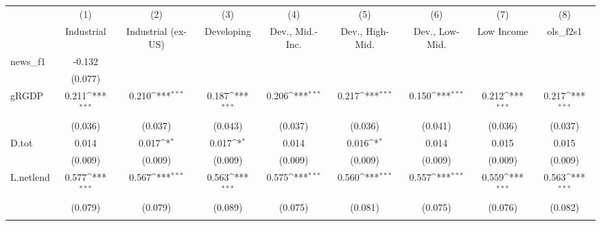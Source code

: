 {
\def\sym#1{\ifmmode^{#1}\else\(^{#1}\)\fi}
\begin{tabular}{l*{8}{c}}
\toprule
            &\multicolumn{1}{c}{(1)}&\multicolumn{1}{c}{(2)}&\multicolumn{1}{c}{(3)}&\multicolumn{1}{c}{(4)}&\multicolumn{1}{c}{(5)}&\multicolumn{1}{c}{(6)}&\multicolumn{1}{c}{(7)}&\multicolumn{1}{c}{(8)}\\
            &\multicolumn{1}{c}{Industrial}&\multicolumn{1}{c}{Industrial (ex-US)}&\multicolumn{1}{c}{Developing}&\multicolumn{1}{c}{Dev., Mid.-Inc.}&\multicolumn{1}{c}{Dev., High-Mid.}&\multicolumn{1}{c}{Dev., Low-Mid.}&\multicolumn{1}{c}{Low Income}&\multicolumn{1}{c}{ols\_f2s1}\\
\midrule
news\_f1     &      -0.132         &                     &                     &                     &                     &                     &                     &                     \\
            &     (0.077)         &                     &                     &                     &                     &                     &                     &                     \\
\addlinespace
gRGDP       &       0.211\sym{***}&       0.210\sym{***}&       0.187\sym{***}&       0.206\sym{***}&       0.217\sym{***}&       0.150\sym{***}&       0.212\sym{***}&       0.217\sym{***}\\
            &     (0.036)         &     (0.037)         &     (0.043)         &     (0.037)         &     (0.036)         &     (0.041)         &     (0.036)         &     (0.037)         \\
\addlinespace
D.tot       &       0.014         &       0.017\sym{*}  &       0.017\sym{*}  &       0.014         &       0.016\sym{*}  &       0.014         &       0.015         &       0.015         \\
            &     (0.009)         &     (0.009)         &     (0.009)         &     (0.009)         &     (0.009)         &     (0.009)         &     (0.009)         &     (0.009)         \\
\addlinespace
L.netlend   &       0.577\sym{***}&       0.567\sym{***}&       0.563\sym{***}&       0.575\sym{***}&       0.560\sym{***}&       0.557\sym{***}&       0.559\sym{***}&       0.563\sym{***}\\
            &     (0.079)         &     (0.079)         &     (0.089)         &     (0.075)         &     (0.081)         &     (0.075)         &     (0.076)         &     (0.082)         \\
\addlinespace

\end{tabular}}
